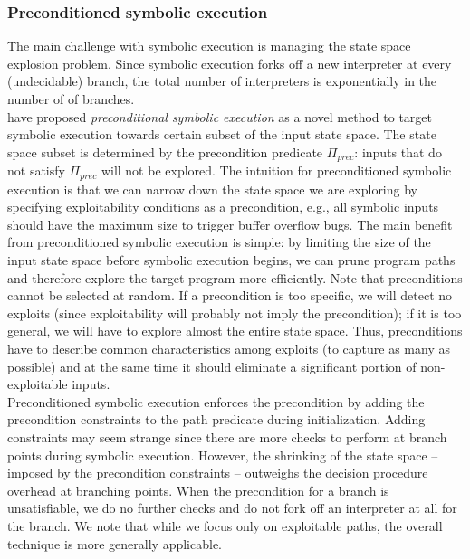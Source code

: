 \documentclass[10pt, a4paper]{article}
\begin{document}
\subsubsection{Preconditioned symbolic execution~\cite{AEG-NDSS11}}
\label{precontioned-symbolic-execution}

The main challenge with symbolic execution is managing the state space explosion problem. Since symbolic execution forks off a new interpreter at every (undecidable) branch, the total number of interpreters is exponentially in the number of of branches.\\

\cite{AEG-NDSS11} have proposed {\em preconditional symbolic execution} as a novel method to target symbolic execution towards certain subset of the input state space. The state space subset is determined by the precondition predicate $\Pi_{prec}$: inputs that do not satisfy $\Pi_{prec}$ will not be explored. The intuition for preconditioned symbolic execution is that we can narrow down the state space we are exploring by specifying exploitability conditions as a precondition, e.g., all symbolic inputs should have the maximum size to trigger buffer overflow bugs. The main benefit from preconditioned symbolic execution is simple: by limiting the size of the input state space before symbolic execution begins, we can prune program paths and therefore explore the target program more efficiently.
Note that preconditions cannot be selected at random. If a precondition is too specific, we will detect no exploits (since exploitability will probably not imply the precondition); if it is too general, we will have to explore almost the entire state space. Thus, preconditions have to describe common characteristics among exploits (to capture as many as possible) and at the same time it should eliminate a significant portion of non-exploitable inputs.\\

Preconditioned symbolic execution enforces the precondition by adding the precondition constraints to the path predicate during initialization. Adding constraints may seem strange since there are more checks to perform at branch points during symbolic execution. However, the shrinking of the state space -- imposed by the precondition constraints -- outweighs the decision procedure overhead at branching points. When the precondition for a branch is unsatisfiable, we do no further checks and do not fork off an interpreter at all for the branch. We note that while we focus only on exploitable paths, the overall technique is more generally applicable.\\
\end{document}
